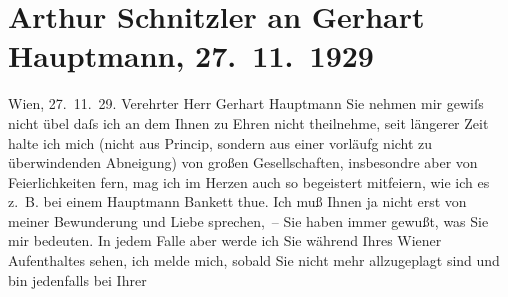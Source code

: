 

         
         \renewcommand{\erwaehntePersonen}{Personen: Gerhart Hauptmann, Margarete Hauptmann}
         \renewcommand{\erwaehnteOrte}{Orte: Wien}
         \renewcommand{\erwaehnteWerke}{Werke: Spuk}
               \section[Arthur Schnitzler an Gerhart Hauptmann, 27. 11. 1929]{ Arthur Schnitzler an Gerhart Hauptmann, 27. 11. 1929}\nopagebreak{}\rehead{ }\begin{ledgroupsized}[t]{13cm}\normalsize\beginnumbering \toendnotes[C]{\smallbreak\pagebreak[2]} 
\toendnotes[C]{\smallbreak}\pstart
           \raggedleft{}{\pb}Wien, 27. 11. 29.\pend
           \pstart{}Verehrter Herr Gerhart Hauptmann\pend\pstart
           Sie nehmen mir gewiſs nicht übel daſs ich an dem \label{K_L02526_1v}\label{K_L02526_1h} Ihnen zu Ehren nicht theilnehme, seit
               längerer Zeit halte ich mich (nicht aus Princip, sondern aus einer vorläufg nicht zu
               überwindenden Abneigung) von großen Gesellschaften, insbesondre aber von
               Feierlichkeiten fern, mag ich im Herzen auch so begeistert mitfeiern, wie ich es
               z. B. bei einem Hauptmann Bankett thue. Ich muß Ihnen ja nicht erst von meiner
               Bewunderung und Liebe sprechen, – Sie haben immer gewußt, was Sie {\pb}mir bedeuten. \pend
           \pstart
           In jedem Falle aber werde ich Sie während Ihres Wiener Aufenthaltes sehen, ich melde mich, sobald Sie nicht mehr allzugeplagt
               sind und bin jedenfalls bei Ihrer \label{K_L02526_2v}
\end{ledgroupsized}

